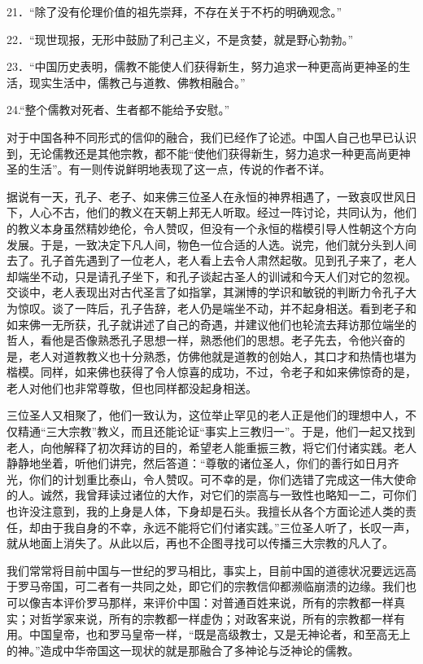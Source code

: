 \documentclass[12pt,oneside]{book}
\begin{document}
\begin{common-format}
21．“除了没有伦理价值的祖先崇拜，不存在关于不朽的明确观念。” 

22．“现世现报，无形中鼓励了利己主义，不是贪婪，就是野心勃勃。” 

23．“中国历史表明，儒教不能使人们获得新生，努力追求一种更高尚更神圣的生活，现实生活中，儒教己与道教、佛教相融合。” 

24.“整个儒教对死者、生者都不能给予安慰。” 

对于中国各种不同形式的信仰的融合，我们已经作了论述。中国人自己也早已认识到，无论儒教还是其他宗教，都不能“使他们获得新生，努力追求一种更高尚更神圣的生活”。有一则传说鲜明地表现了这一点，传说的作者不详。 

据说有一天，孔子、老子、如来佛三位圣人在永恒的神界相遇了，一致哀叹世风日下，人心不古，他们的教义在天朝上邦无人听取。经过一阵讨论，共同认为，他们的教义本身虽然精妙绝伦，令人赞叹，但没有一个永恒的楷模引导人性朝这个方向发展。于是，一致决定下凡人间，物色一位合适的人选。说完，他们就分头到人间去了。孔子首先遇到了一位老人，老人看上去令人肃然起敬。见到孔子来了，老人却端坐不动，只是请孔子坐下，和孔子谈起古圣人的训诫和今天人们对它的忽视。交谈中，老人表现出对古代圣言了如指掌，其渊博的学识和敏锐的判断力令孔子大为惊叹。谈了一阵后，孔子告辞，老人仍是端坐不动，并不起身相送。看到老子和如来佛一无所获，孔子就讲述了自己的奇遇，并建议他们也轮流去拜访那位端坐的哲人，看他是否像熟悉孔子思想一样，熟悉他们的思想。老子先去，令他兴奋的是，老人对道教教义也十分熟悉，仿佛他就是道教的创始人，其口才和热情也堪为楷模。同样，如来佛也获得了令人惊喜的成功，不过，令老子和如来佛惊奇的是，老人对他们也非常尊敬，但也同样都没起身相送。 

三位圣人又相聚了，他们一致认为，这位举止罕见的老人正是他们的理想中人，不仅精通“三大宗教”教义，而且还能论证“事实上三教归一”。于是，他们一起又找到老人，向他解释了初次拜访的目的，希望老人能重振三教，将它们付诸实践。老人静静地坐着，听他们讲完，然后答道：“尊敬的诸位圣人，你们的善行如日月齐光，你们的计划重比泰山，令人赞叹。可不幸的是，你们选错了完成这一伟大使命的人。诚然，我曾拜读过诸位的大作，对它们的崇高与一致性也略知一二，可你们也许没注意到，我的上身是人体，下身却是石头。我擅长从各个方面论述人类的责任，却由于我自身的不幸，永远不能将它们付诸实践。”三位圣人听了，长叹一声，就从地面上消失了。从此以后，再也不企图寻找可以传播三大宗教的凡人了。 

我们常常将目前中国与一世纪的罗马相比，事实上，目前中国的道德状况要远远高于罗马帝国，可二者有一共同之处，即它们的宗教信仰都濒临崩溃的边缘。我们也可以像吉本评价罗马那样，来评价中国：对普通百姓来说，所有的宗教都一样真实；对哲学家来说，所有的宗教都一样虚伪；对政客来说，所有的宗教都一样有用。中国皇帝，也和罗马皇帝一样，“既是高级教士，又是无神论者，和至高无上的神。”造成中华帝国这一现状的就是那融合了多神论与泛神论的儒教。 


\end{common-format}
\end{document}
